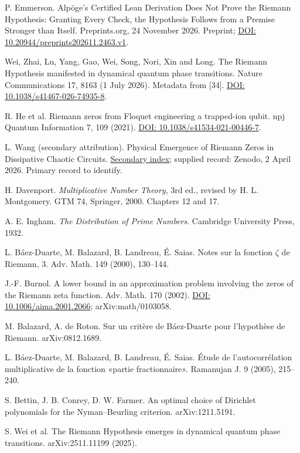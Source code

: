\documentclass[11pt,a4paper]{article}
\begin{document}
\begin{enumerate}[label={[\arabic*]},leftmargin=2.2em,itemsep=2pt,font=\footnotesize]
\item P. Emmerson. Alpöge's Certified Lean Derivation Does Not Prove the Riemann Hypothesis: Granting Every Check, the Hypothesis Follows from a Premise Stronger than Itself. Preprints.org, 24 November 2026. Preprint; \href{https://www.preprints.org/manuscript/202611.2463}{DOI: 10.20944/preprints202611.2463.v1}.
\item Wei, Zhai, Lu, Yang, Gao, Wei, Song, Nori, Xin and Long. The Riemann Hypothesis manifested in dynamical quantum phase transitions. Nature Communications 17, 8163 (1 July 2026). Metadata from [34]. \href{https://doi.org/10.1038/s41467-026-74935-8}{DOI: 10.1038/s41467-026-74935-8}.
\item R. He et al. Riemann zeros from Floquet engineering a trapped-ion qubit. npj Quantum Information 7, 109 (2021). \href{https://doi.org/10.1038/s41534-021-00446-7}{DOI: 10.1038/s41534-021-00446-7}.
\item L. Wang (secondary attribution). Physical Emergence of Riemann Zeros in Dissipative Chaotic Circuits. \href{https://synapsesocial.com/papers/W7151460771}{Secondary index}; supplied record: Zenodo, 2 April 2026. Primary record to identify.
\item H. Davenport. \emph{Multiplicative Number Theory}, 3rd ed., revised by H. L. Montgomery. GTM 74, Springer, 2000. Chapters 12 and 17.
\item A. E. Ingham. \emph{The Distribution of Prime Numbers}. Cambridge University Press, 1932.
\item L. Báez-Duarte, M. Balazard, B. Landreau, É. Saias. Notes sur la fonction $\zeta$ de Riemann, 3. Adv. Math. 149 (2000), 130--144.
\item J.-F. Burnol. A lower bound in an approximation problem involving the zeros of the Riemann zeta function. Adv. Math. 170 (2002). \href{https://doi.org/10.1006/aima.2001.2066}{DOI: 10.1006/aima.2001.2066}; arXiv:math/0103058.
\item M. Balazard, A. de Roton. Sur un critère de Báez-Duarte pour l'hypothèse de Riemann. arXiv:0812.1689.
\item L. Báez-Duarte, M. Balazard, B. Landreau, É. Saias. Étude de l'autocorrélation multiplicative de la fonction «partie fractionnaire». Ramanujan J. 9 (2005), 215--240.
\item S. Bettin, J. B. Conrey, D. W. Farmer. An optimal choice of Dirichlet polynomials for the Nyman--Beurling criterion. arXiv:1211.5191.
\item S. Wei et al. The Riemann Hypothesis emerges in dynamical quantum phase transitions. arXiv:2511.11199 (2025).

\end{enumerate}
\end{document}
